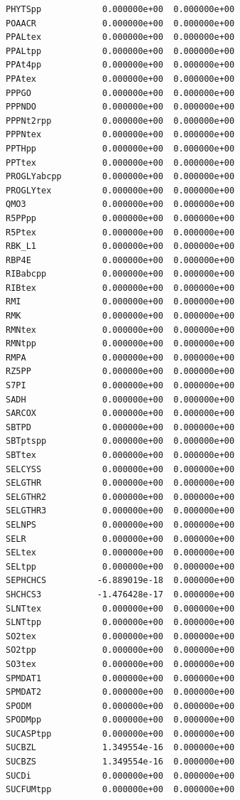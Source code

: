 \documentclass{scrartcl}
\begin{document}
\begin{enumerate}
\begin{lstlisting}
PHYTSpp            0.000000e+00  0.000000e+00
POAACR             0.000000e+00  0.000000e+00
PPALtex            0.000000e+00  0.000000e+00
PPALtpp            0.000000e+00  0.000000e+00
PPAt4pp            0.000000e+00  0.000000e+00
PPAtex             0.000000e+00  0.000000e+00
PPPGO              0.000000e+00  0.000000e+00
PPPNDO             0.000000e+00  0.000000e+00
PPPNt2rpp          0.000000e+00  0.000000e+00
PPPNtex            0.000000e+00  0.000000e+00
PPTHpp             0.000000e+00  0.000000e+00
PPTtex             0.000000e+00  0.000000e+00
PROGLYabcpp        0.000000e+00  0.000000e+00
PROGLYtex          0.000000e+00  0.000000e+00
QMO3               0.000000e+00  0.000000e+00
R5PPpp             0.000000e+00  0.000000e+00
R5Ptex             0.000000e+00  0.000000e+00
RBK_L1             0.000000e+00  0.000000e+00
RBP4E              0.000000e+00  0.000000e+00
RIBabcpp           0.000000e+00  0.000000e+00
RIBtex             0.000000e+00  0.000000e+00
RMI                0.000000e+00  0.000000e+00
RMK                0.000000e+00  0.000000e+00
RMNtex             0.000000e+00  0.000000e+00
RMNtpp             0.000000e+00  0.000000e+00
RMPA               0.000000e+00  0.000000e+00
RZ5PP              0.000000e+00  0.000000e+00
S7PI               0.000000e+00  0.000000e+00
SADH               0.000000e+00  0.000000e+00
SARCOX             0.000000e+00  0.000000e+00
SBTPD              0.000000e+00  0.000000e+00
SBTptspp           0.000000e+00  0.000000e+00
SBTtex             0.000000e+00  0.000000e+00
SELCYSS            0.000000e+00  0.000000e+00
SELGTHR            0.000000e+00  0.000000e+00
SELGTHR2           0.000000e+00  0.000000e+00
SELGTHR3           0.000000e+00  0.000000e+00
SELNPS             0.000000e+00  0.000000e+00
SELR               0.000000e+00  0.000000e+00
SELtex             0.000000e+00  0.000000e+00
SELtpp             0.000000e+00  0.000000e+00
SEPHCHCS          -6.889019e-18  0.000000e+00
SHCHCS3           -1.476428e-17  0.000000e+00
SLNTtex            0.000000e+00  0.000000e+00
SLNTtpp            0.000000e+00  0.000000e+00
SO2tex             0.000000e+00  0.000000e+00
SO2tpp             0.000000e+00  0.000000e+00
SO3tex             0.000000e+00  0.000000e+00
SPMDAT1            0.000000e+00  0.000000e+00
SPMDAT2            0.000000e+00  0.000000e+00
SPODM              0.000000e+00  0.000000e+00
SPODMpp            0.000000e+00  0.000000e+00
SUCASPtpp          0.000000e+00  0.000000e+00
SUCBZL             1.349554e-16  0.000000e+00
SUCBZS             1.349554e-16  0.000000e+00
SUCDi              0.000000e+00  0.000000e+00
SUCFUMtpp          0.000000e+00  0.000000e+00

\end{lstlisting}
\end{enumerate}
\end{document}

